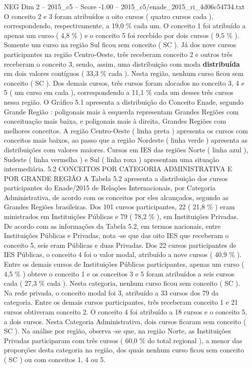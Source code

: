 \begin{textsample}{NEG Dim 2 – 2015\_c5 – Score -1.00 – 2015\_c5/enade\_2015\_ri\_4d06c54734.txt}
O conceito 2 e 3 foram atribuídos a oito cursos ( quatro cursos cada ), correspondendo, respectivamente, a 19,0 \% cada um.
O conceito 1 foi atribuído a apenas um curso ( 4,8 \% ) e o conceito 5 foi recebido por dois cursos ( 9,5 \% ).
Somente um curso na região Sul ficou sem conceito ( SC ).
Já dos nove cursos participantes na região Centro-Oeste, três receberam conceito 2 e outros três receberam o conceito 3, sendo, assim, uma distribuição com moda \textbf{distribuída} em dois valores contíguos ( 33,3 \% cada ).
Nesta região, nenhum curso ficou sem conceito ( SC ).
Dos demais cursos, três cursos foram alocados no conceito 3, 4 e 5 ( um curso em cada ), correspondendo a 11,1 \% cada um desses três cursos nessa região.
O Gráfico 5.1 apresenta a distribuição do Conceito Enade, segundo Grande Região : poligonais mais à esquerda representam Grandes Regiões com conceituação mais baixa, e poligonais mais à direita, Grandes Regiões com melhores conceitos.
A região Centro-Oeste ( linha preta ) apresenta os cursos com conceitos mais baixos, ao passo que a região Nordeste ( linha verde ) apresenta as distribuições com valores maiores.
Cursos em IES das regiões Norte ( linha azul ), Sudeste ( linha vermelha ) e Sul ( linha roxa ) apresentam uma situação intermediária. 5.2 CONCEITOS POR CATEGORIA ADMINISTRATIVA E POR GRANDE REGIÃO A Tabela 5.2 apresenta a distribuição dos cursos participantes do Enade/2015 de Relações Internacionais, por Categoria Administrativa, de acordo com os conceitos por eles alcançados, segundo as Grandes Regiões brasileiras.
Dos 101 cursos participantes, 22 ( 21,8 \% ) eram ministrados em Instituições Públicas e 79 ( 78,2 \% ), em Instituições Privadas.
De acordo com as informações da Tabela 5.2, em termos nacionais, entre Instituições Públicas e Privadas, nota -se que das oito IES que receberam o conceito 5, seis eram Públicas e duas Privadas.
Dos 22 cursos participantes de IES Públicas, o conceito 4 foi o valor modal, atribuído a nove cursos ( 40,9 \% ).
Entre os demais cursos de Instituições Públicas participantes, apenas um curso ( 4,5 \% ) obteve o conceito 1 e os conceitos 3 e 5 foram atribuídos a seis cursos cada ( 27,3 \% cada ).
Nesta categoria, nenhum curso ficou sem conceito ( SC ).
Na rede privada, o conceito modal foi 3, atribuído a 33 cursos dos 79 da categoria.
Entre os demais cursos participantes, três receberam conceito 1 e 21 cursos obtiveram conceito 2.
O conceito 4 foi atribuído a 18 cursos e o conceito 5, a dois cursos.
Nesta Categoria Administrativa, dois cursos ficaram sem conceito ( SC ).
Na análise por região, observa -se que, na região Norte, as Instituições Privadas participaram com três cursos ( 60,0 \% do total regional ), a menor das proporções desta categoria na região, dos quais nenhum curso ficou sem conceito ( SC ) ou com conceitos 1, 4 ou 5.

\end{textsample}
